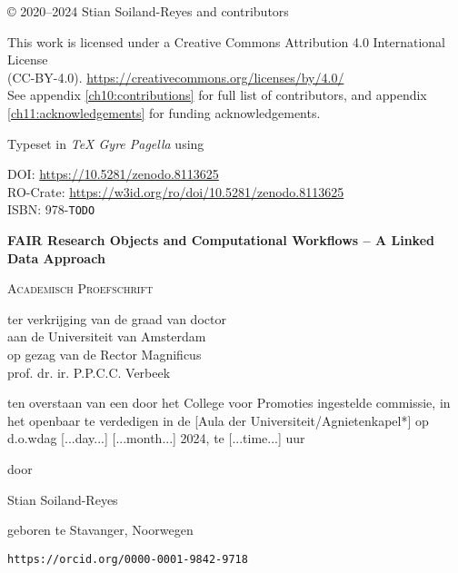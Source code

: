 \newpage

\vspace*{\fill}

© 2020--2024 Stian Soiland-Reyes and contributors

This work is licensed under a Creative Commons Attribution 4.0 International License \\
(CC-BY-4.0). \url{https://creativecommons.org/licenses/by/4.0/}\\
See appendix \ref{ch10:contributions} for full list of contributors, and appendix \ref{ch11:acknowledgements} for funding acknowledgements.


Typeset in \emph{TeX Gyre Pagella} using \mybanner

DOI: \url{https://10.5281/zenodo.8113625}\\
RO-Crate: \url{https://w3id.org/ro/doi/10.5281/zenodo.8113625}\\
ISBN: 978-\texttt{TODO}

\newpage

\begin{center}

    
\Huge
\textbf{FAIR Research Objects and Computational Workflows – A Linked Data Approach}
     
\vspace*{\fill}

\LARGE
\textsc{Academisch Proefschrift}

\vspace*{\fill}

\large
{ \itshape

ter verkrijging van de graad van doctor\\
aan de Universiteit van Amsterdam\\
op gezag van de Rector Magnificus\\
prof. dr. ir. P.P.C.C. Verbeek

ten overstaan van een door het College voor Promoties ingestelde commissie,
in het openbaar te verdedigen in de [Aula der Universiteit/Agnietenkapel*]
op d.o.wdag [...day...] [...month...] 2024, te [...time...] uur

door 
}

\vspace*{\fill}

\LARGE
Stian Soiland-Reyes

\large
geboren te Stavanger, Noorwegen 

\texttt{https://orcid.org/0000-0001-9842-9718} 
\end{center}

